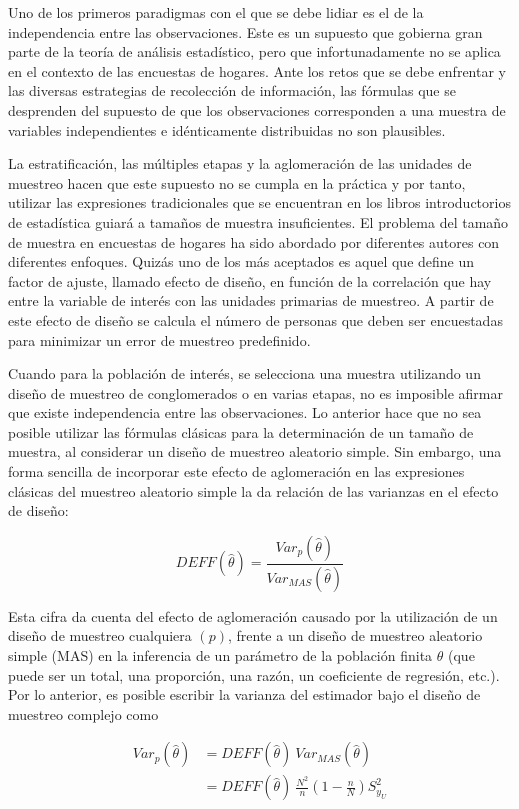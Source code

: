 \documentclass[
  12pt,
]{book}
\begin{document}
Uno de los primeros paradigmas con el que se debe lidiar es el de la independencia entre las observaciones. Este es un supuesto que gobierna gran parte de la teoría de análisis estadístico, pero que infortunadamente no se aplica en el contexto de las encuestas de hogares. Ante los retos que se debe enfrentar y las diversas estrategias de recolección de información, las fórmulas que se desprenden del supuesto de que los observaciones corresponden a una muestra de variables independientes e idénticamente distribuidas no son plausibles.

La estratificación, las múltiples etapas y la aglomeración de las unidades de muestreo hacen que este supuesto no se cumpla en la práctica y por tanto, utilizar las expresiones tradicionales que se encuentran en los libros introductorios de estadística guiará a tamaños de muestra insuficientes. El problema del tamaño de muestra en encuestas de hogares ha sido abordado por diferentes autores con diferentes enfoques. Quizás uno de los más aceptados es aquel que define un factor de ajuste, llamado efecto de diseño, en función de la correlación que hay entre la variable de interés con las unidades primarias de muestreo. A partir de este efecto de diseño se calcula el número de personas que deben ser encuestadas para minimizar un error de muestreo predefinido.

Cuando para la población de interés, se selecciona una muestra utilizando un diseño de muestreo de conglomerados o en varias etapas, no es imposible afirmar que existe independencia entre las observaciones. Lo anterior hace que no sea posible utilizar las fórmulas clásicas para la determinación de un tamaño de muestra, al considerar un diseño de muestreo aleatorio simple. Sin embargo, una forma sencilla de incorporar este efecto de aglomeración en las expresiones clásicas del muestreo aleatorio simple la da relación de las varianzas en el efecto de diseño:

\[
DEFF(\hat{\theta})=\frac{Var_p(\hat{\theta})}{Var_{MAS}(\hat{\theta})}
\]

Esta cifra da cuenta del efecto de aglomeración causado por la utilización de un diseño de muestreo cualquiera \((p)\), frente a un diseño de muestreo aleatorio simple (MAS) en la inferencia de un parámetro de la población finita \(\theta\) (que puede ser un total, una proporción, una razón, un coeficiente de regresión, etc.). Por lo anterior, es posible escribir la varianza del estimador bajo el diseño de muestreo complejo como

\begin{align}
Var_p(\hat{\theta}) & = DEFF(\hat{\theta}) \ Var_{MAS}(\hat{\theta}) \\
& = DEFF(\hat{\theta}) \ \frac{N^2}{n}\left(1-\frac{n}{N}\right)S^2_{y_U}
\end{align}
\end{document}
